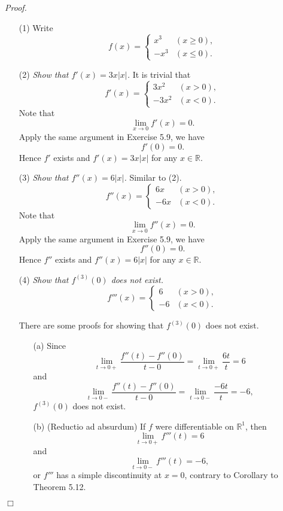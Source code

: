 \documentclass{article}
\begin{document}
\emph{Proof.}
\begin{enumerate}
  \item[(1)]
  Write
  \begin{equation*}
    f(x) =
    \begin{cases}
      x^3 & (x \geq 0), \\
      -x^3 & (x \leq 0).
    \end{cases}
  \end{equation*}

  \item[(2)]
  \emph{Show that $f'(x) = 3x|x|$.}
  It is trivial that
  \begin{equation*}
    f'(x) =
    \begin{cases}
      3x^2 & (x > 0), \\
      -3x^2 & (x < 0).
    \end{cases}
  \end{equation*}
  Note that
  \[
    \lim_{x \to 0} f'(x) = 0.
  \]
  Apply the same argument in Exercise 5.9, we have
  \[
    f'(0) = 0.
  \]
  Hence $f'$ exists and $f'(x) = 3x|x|$ for any $x \in \mathbb{R}$.

  \item[(3)]
  \emph{Show that $f''(x) = 6|x|$.}
  Similar to (2).
  \begin{equation*}
    f''(x) =
    \begin{cases}
      6x & (x > 0), \\
      -6x & (x < 0).
    \end{cases}
  \end{equation*}
  Note that
  \[
    \lim_{x \to 0} f''(x) = 0.
  \]
  Apply the same argument in Exercise 5.9, we have
  \[
    f''(0) = 0.
  \]
  Hence $f''$ exists and $f''(x) = 6|x|$ for any $x \in \mathbb{R}$.

  \item[(4)]
  \emph{Show that $f^{(3)} (0)$ does not exist.}
  \begin{equation*}
    f'''(x) =
    \begin{cases}
      6 & (x > 0), \\
      -6 & (x < 0).
    \end{cases}
  \end{equation*}

  There are some proofs for showing that $f^{(3)} (0)$ does not exist.
  \begin{enumerate}
  \item[(a)]
  Since
  \[
    \lim_{t \to 0+} \frac{f''(t) - f''(0)}{t - 0}
    = \lim_{t \to 0+} \frac{6t}{t} = 6
  \]
  and
  \[
    \lim_{t \to 0-} \frac{f''(t) - f''(0)}{t - 0}
    = \lim_{t \to 0-} \frac{-6t}{t} = -6,
  \]
  $f^{(3)} (0)$ does not exist.

  \item[(b)]
  (Reductio ad absurdum)
  If $f$ were differentiable on $\mathbb{R}^1$,
  then
  \[
    \lim_{t \to 0+} f'''(t) = 6
  \]
  and
  \[
    \lim_{t \to 0-} f'''(t) = -6,
  \]
  or $f'''$ has a simple discontinuity at $x = 0$,
  contrary to Corollary to Theorem 5.12.
  \end{enumerate}
\end{enumerate}
$\Box$ \\
\end{document}
